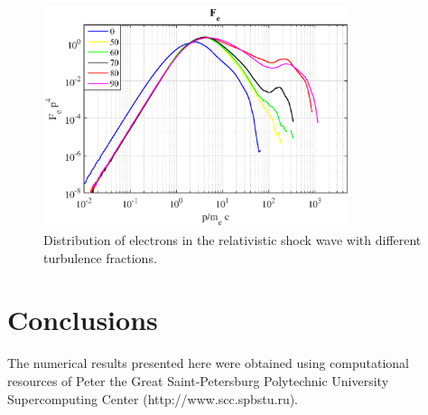 \documentclass[a4paper]{jpconf}
\begin{document}
\begin{figure}[h!]
	\centering
	\includegraphics[width=0.8\textwidth]{fig/spectrum.eps} 
	\caption{Distribution of electrons in the relativistic shock wave with different turbulence fractions.}
	\label{spectrum}
\end{figure} 

\section{Conclusions}

\ack

The numerical results presented here were obtained using computational resources of Peter the Great Saint-Petersburg Polytechnic University Supercomputing Center (http://www.scc.spbstu.ru). 
\end{document}
